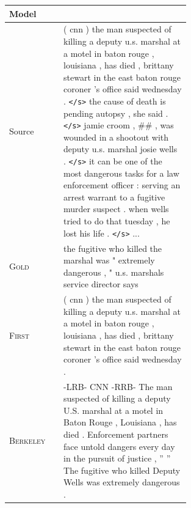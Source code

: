 \documentclass[12pt]{report}
\begin{document}
\begin{figure}[p]
\centering
\begin{tabular}{ll p{0.7\linewidth}}
\toprule
Model & & \\
\midrule
Source & & ( cnn ) the man suspected of killing a deputy u.s. marshal at a motel in baton rouge , louisiana , has died , brittany stewart in the east baton rouge coroner 's office said wednesday . \texttt{</s>} the cause of death is pending autopsy , she said . \texttt{</s>} jamie croom , \#\# , was wounded in a shootout with deputy u.s. marshal josie wells . \texttt{</s>} it can be one of the most dangerous tasks for a law enforcement officer : serving an arrest warrant to a fugitive murder suspect . when wells tried to do that tuesday , he lost his life . \texttt{</s>}  ... \\
\midrule
\textsc{Gold} & & the fugitive who killed the marshal was " extremely dangerous , " u.s. marshals service director says \\
\midrule
\textsc{First} & & ( cnn ) the man suspected of killing a deputy u.s. marshal at a motel in baton rouge , louisiana , has died , brittany stewart in the east baton rouge coroner 's office said wednesday .\\
 \midrule
\textsc{Berkeley} & & -LRB- CNN -RRB- The man suspected of killing a deputy U.S. marshal at a motel in Baton Rouge , Louisiana , has died . Enforcement partners face untold dangers every day in the pursuit of justice , '' '' The fugitive who killed Deputy Wells was extremely dangerous . \\
\midrule


\end{tabular}
\end{figure}
\end{document}
